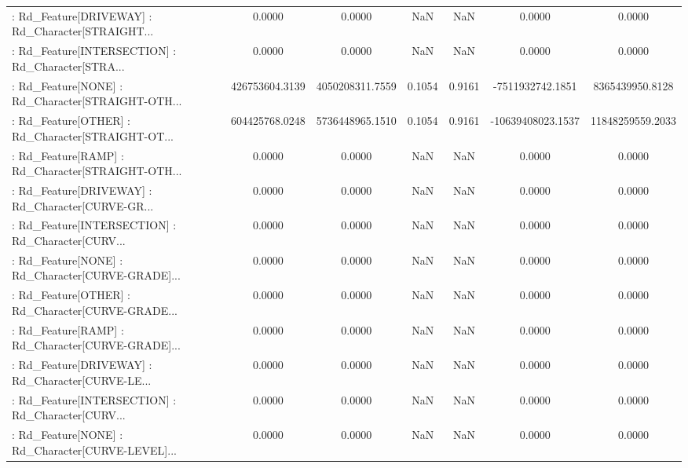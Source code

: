 \begin{longtable}{p{4cm}cccccc}
 : Rd\_Feature[DRIVEWAY] : Rd\_Character[STRAIGHT... &            0.0000 &            0.0000 &     NaN &          NaN &             0.0000 &            0.0000 \\
 : Rd\_Feature[INTERSECTION] : Rd\_Character[STRA... &            0.0000 &            0.0000 &     NaN &          NaN &             0.0000 &            0.0000 \\
 : Rd\_Feature[NONE] : Rd\_Character[STRAIGHT-OTH... &    426753604.3139 &   4050208311.7559 &  0.1054 &       0.9161 &   -7511932742.1851 &   8365439950.8128 \\
 : Rd\_Feature[OTHER] : Rd\_Character[STRAIGHT-OT... &    604425768.0248 &   5736448965.1510 &  0.1054 &       0.9161 &  -10639408023.1537 &  11848259559.2033 \\
 : Rd\_Feature[RAMP] : Rd\_Character[STRAIGHT-OTH... &            0.0000 &            0.0000 &     NaN &          NaN &             0.0000 &            0.0000 \\
 : Rd\_Feature[DRIVEWAY] : Rd\_Character[CURVE-GR... &            0.0000 &            0.0000 &     NaN &          NaN &             0.0000 &            0.0000 \\
 : Rd\_Feature[INTERSECTION] : Rd\_Character[CURV... &            0.0000 &            0.0000 &     NaN &          NaN &             0.0000 &            0.0000 \\
 : Rd\_Feature[NONE] : Rd\_Character[CURVE-GRADE]... &            0.0000 &            0.0000 &     NaN &          NaN &             0.0000 &            0.0000 \\
 : Rd\_Feature[OTHER] : Rd\_Character[CURVE-GRADE... &            0.0000 &            0.0000 &     NaN &          NaN &             0.0000 &            0.0000 \\
 : Rd\_Feature[RAMP] : Rd\_Character[CURVE-GRADE]... &            0.0000 &            0.0000 &     NaN &          NaN &             0.0000 &            0.0000 \\
 : Rd\_Feature[DRIVEWAY] : Rd\_Character[CURVE-LE... &            0.0000 &            0.0000 &     NaN &          NaN &             0.0000 &            0.0000 \\
 : Rd\_Feature[INTERSECTION] : Rd\_Character[CURV... &            0.0000 &            0.0000 &     NaN &          NaN &             0.0000 &            0.0000 \\
 : Rd\_Feature[NONE] : Rd\_Character[CURVE-LEVEL]... &            0.0000 &            0.0000 &     NaN &          NaN &             0.0000 &            0.0000 \\

\end{longtable}
